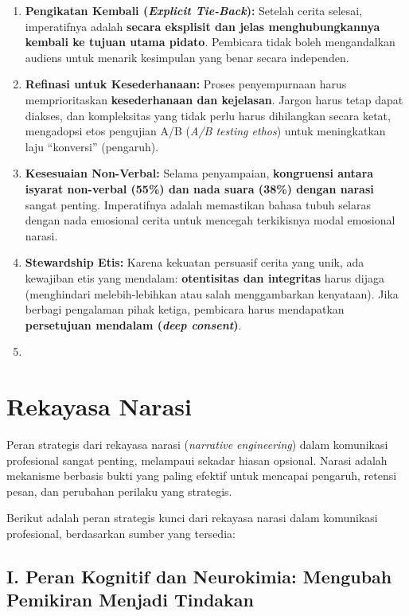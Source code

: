 \documentclass[
  letterpaper,
  DIV=11,
  numbers=noendperiod]{scrreprt}
\providecommand{\tightlist}{%
  \setlength{\itemsep}{0pt}\setlength{\parskip}{0pt}}
\begin{document}
\begin{enumerate}
\def\labelenumi{\arabic{enumi}.}
\tightlist
\item
  \textbf{Pengikatan Kembali (\emph{Explicit Tie-Back}):} Setelah cerita
  selesai, imperatifnya adalah \textbf{secara eksplisit dan jelas
  menghubungkannya kembali ke tujuan utama pidato}. Pembicara tidak
  boleh mengandalkan audiens untuk menarik kesimpulan yang benar secara
  independen.
\item
  \textbf{Refinasi untuk Kesederhanaan:} Proses penyempurnaan harus
  memprioritaskan \textbf{kesederhanaan dan kejelasan}. Jargon harus
  tetap dapat diakses, dan kompleksitas yang tidak perlu harus
  dihilangkan secara ketat, mengadopsi etos pengujian A/B (\emph{A/B
  testing ethos}) untuk meningkatkan laju ``konversi'' (pengaruh).
\item
  \textbf{Kesesuaian Non-Verbal:} Selama penyampaian, \textbf{kongruensi
  antara isyarat non-verbal (55\%) dan nada suara (38\%) dengan narasi}
  sangat penting. Imperatifnya adalah memastikan bahasa tubuh selaras
  dengan nada emosional cerita untuk mencegah terkikisnya modal
  emosional narasi.
\item
  \textbf{Stewardship Etis:} Karena kekuatan persuasif cerita yang unik,
  ada kewajiban etis yang mendalam: \textbf{otentisitas dan integritas}
  harus dijaga (menghindari melebih-lebihkan atau salah menggambarkan
  kenyataan). Jika berbagi pengalaman pihak ketiga, pembicara harus
  mendapatkan \textbf{persetujuan mendalam (\emph{deep consent})}.
\item
\end{enumerate}

\section{Rekayasa Narasi}\label{rekayasa-narasi}

Peran strategis dari rekayasa narasi (\emph{narrative engineering})
dalam komunikasi profesional sangat penting, melampaui sekadar hiasan
opsional. Narasi adalah mekanisme berbasis bukti yang paling efektif
untuk mencapai pengaruh, retensi pesan, dan perubahan perilaku yang
strategis.

Berikut adalah peran strategis kunci dari rekayasa narasi dalam
komunikasi profesional, berdasarkan sumber yang tersedia:

\subsection{I. Peran Kognitif dan Neurokimia: Mengubah Pemikiran Menjadi
Tindakan}\label{i.-peran-kognitif-dan-neurokimia-mengubah-pemikiran-menjadi-tindakan}
\end{document}
